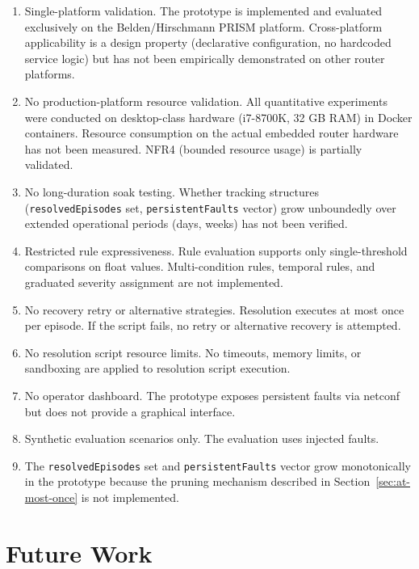 \begin{enumerate}
\item Single-platform validation. The prototype is implemented and evaluated exclusively on the Belden/Hirschmann PRISM platform. Cross-platform applicability is a design property (declarative configuration, no hardcoded service logic) but has not been empirically demonstrated on other router platforms.

\item No production-platform resource validation. All quantitative experiments were conducted on desktop-class hardware (i7-8700K, 32 GB RAM) in Docker containers. Resource consumption on the actual embedded router hardware has not been measured. NFR4 (bounded resource usage) is partially validated.

\item No long-duration soak testing. Whether tracking structures (\texttt{resolvedEpisodes} set, \texttt{persistentFaults} vector) grow unboundedly over extended operational periods (days, weeks) has not been verified.

\item Restricted rule expressiveness. Rule evaluation supports only single-threshold comparisons on float values. Multi-condition rules, temporal rules, and graduated severity assignment are not implemented.

\item No recovery retry or alternative strategies. Resolution executes at most once per episode. If the script fails, no retry or alternative recovery is attempted.

\item No resolution script resource limits. No timeouts, memory limits, or sandboxing are applied to resolution script execution.

\item No operator dashboard. The prototype exposes persistent faults via \gls{netconf} but does not provide a graphical interface.

\item Synthetic evaluation scenarios only. The evaluation uses injected faults.

\item The \texttt{resolvedEpisodes} set and \texttt{persistentFaults} vector grow monotonically in the prototype because the pruning mechanism described in Section~\ref{sec:at-most-once} is not implemented.
\end{enumerate}

\section{Future Work}\label{sec:future-work}

